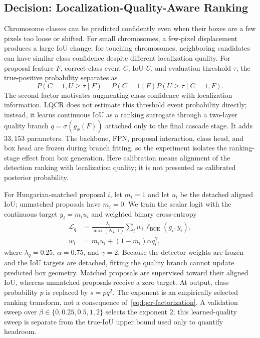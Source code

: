 \documentclass[journal,10pt]{IEEEtran}
\theoremstyle{definition}
\begin{document}
\subsection{Decision: Localization-Quality-Aware Ranking}\label{sec:method-lqcr}

Chromosome classes can be predicted confidently even when their boxes are a
few pixels too loose or shifted. For small chromosomes, a few-pixel
displacement produces a large IoU change; for touching chromosomes,
neighboring candidates can have similar class confidence despite different
localization quality.
For proposal feature $F$, correct-class event $C$, IoU $U$, and evaluation
threshold $\tau$, the true-positive probability separates as
\begin{equation}
 P(C{=}1,U{\geq}\tau\mid F)
 =P(C{=}1\mid F)P(U{\geq}\tau\mid C{=}1,F).
 \label{eq:lqcr-factorization}
\end{equation}
The second factor motivates augmenting class confidence with localization
information. LQCR does not estimate this threshold event probability directly;
instead, it learns continuous IoU as a ranking surrogate through a two-layer
quality branch $q=\sigma(g_\phi(F))$ attached only to the final cascade stage.
It adds $33{,}153$ parameters. The backbone, FPN, proposal
interaction, class head, and box head are frozen during branch fitting, so the
experiment isolates the ranking-stage effect from box generation.
Here calibration means alignment of the detection ranking with localization
quality; it is not presented as calibrated posterior probability.

For Hungarian-matched proposal $i$, let $m_i=1$ and let $u_i$ be the detached
aligned IoU; unmatched proposals have $m_i=0$. We train the scalar logit with
the continuous target $y_i=m_iu_i$ and weighted binary cross-entropy
\begin{equation}
 \begin{aligned}
 \mathcal{L}_{q}&=\frac{\lambda_q}{\max(N_+,1)}
 \sum_i w_i\,\ell_{\mathrm{BCE}}(g_i,y_i),\\
 w_i&=m_iu_i+(1-m_i)\alpha q_i^{\gamma},
 \end{aligned}
 \label{eq:quality-loss}
\end{equation}
where $\lambda_q=0.25$, $\alpha=0.75$, and $\gamma=2$. Because the detector
weights are frozen and the IoU targets are detached, fitting the quality branch
cannot update predicted box geometry. Matched proposals are supervised toward
their aligned IoU, whereas unmatched proposals receive a zero target. At output,
class probability $p$ is
replaced by $s=pq^2$. The exponent is an empirically selected ranking transform,
not a consequence of~\eqref{eq:lqcr-factorization}. A validation sweep over
$\beta\in\{0,0.25,0.5,1,2\}$ selects the exponent $2$; this learned-quality
sweep is separate from the true-IoU upper bound used only to quantify headroom.
\end{document}

